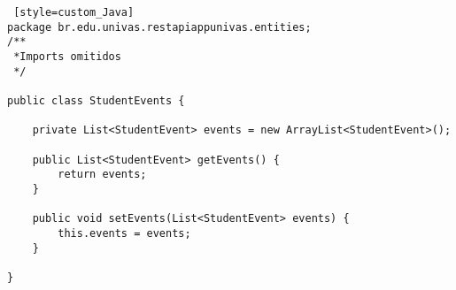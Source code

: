 \begin{lstlisting} [style=custom_Java]
package br.edu.univas.restapiappunivas.entities;
/**
 *Imports omitidos
 */

public class StudentEvents {

	private List<StudentEvent> events = new ArrayList<StudentEvent>();

	public List<StudentEvent> getEvents() {
		return events;
	}

	public void setEvents(List<StudentEvent> events) {
		this.events = events;
	}

}
\end{lstlisting}
